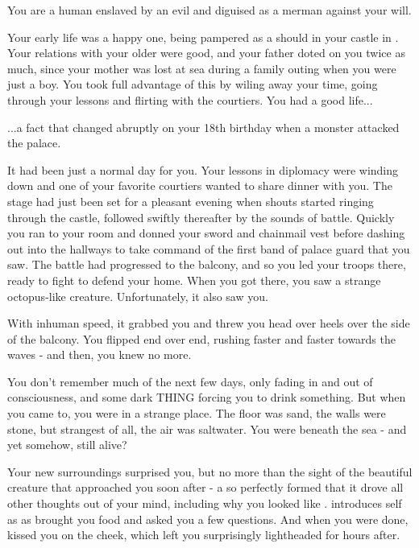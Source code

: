 \documentclass[char]{NeptuneBall}
\begin{document}
\name{\cSlave{}}

You are a human \cSlave{\Prince} enslaved by an evil \cWitch{\magician} and diguised as a merman against your will.

Your early life was a happy one, being pampered as a \cSlave{\Prince} should in your castle in \pAmerica{}. Your relations with your older \cEric{\sibling} were good, and your father doted on you twice as much, since your mother was lost at sea during a family outing when you were just a boy. You took full advantage of this by wiling away your time, going through your lessons and flirting with the courtiers. You had a good life...

...a fact that changed abruptly on your 18th birthday when a monster attacked the palace.

It had been just a normal day for you. Your lessons in diplomacy were winding down and one of your favorite courtiers wanted to share dinner with you. The stage had just been set for a pleasant evening when shouts started ringing through the castle, followed swiftly thereafter by the sounds of battle. Quickly you ran to your room and donned your sword and chainmail vest before dashing out into the hallways to take command of the first band of palace guard that you saw. The battle had progressed to the balcony, and so you led your troops there, ready to fight to defend your home. When you got there, you saw a strange octopus-like creature. Unfortunately, it also saw you.

With inhuman speed, it grabbed you and threw you head over heels over the side of the balcony. You flipped end over end, rushing faster and faster towards the waves - and then, you knew no more.

You don't remember much of the next few days, only fading in and out of consciousness, and some dark THING forcing you to drink something. But when you came to, you were in a strange place. The floor was sand, the walls were stone, but strangest of all, the air was saltwater. You were beneath the sea - and yet somehow, still alive?

Your new surroundings surprised you, but no more than the sight of the beautiful creature that approached you soon after - a \cWitch{\mer} so perfectly formed that it drove all other thoughts out of your mind, including why you looked like \cWitch{\they}. \cWitch{\They} introduces \cWitch{\their}self as \cWitch{} as \cWitch{\they} brought you food and asked you a few questions. And when you were done, \cWitch{\they} kissed you on the cheek, which left you surprisingly lightheaded for hours after.
\end{document}
